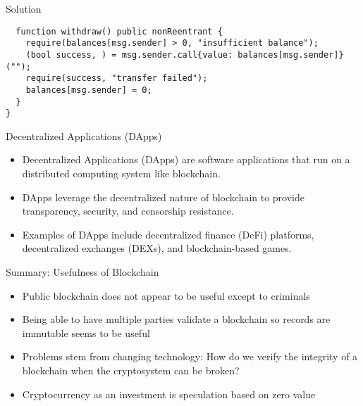 \begin{withoutheadline}
\begin{frame}[fragile]{Solution}
\begin{lstlisting}
  function withdraw() public nonReentrant { 
    require(balances[msg.sender] > 0, "insufficient balance");
    (bool success, ) = msg.sender.call{value: balances[msg.sender]}("");
    require(success, "transfer failed");
    balances[msg.sender] = 0;
  }
}
\end{lstlisting}
\end{frame}

\begin{frame}{Decentralized Applications (DApps)}
    \begin{itemize}
        \item Decentralized Applications (DApps) are software applications that run on a distributed computing system like blockchain.
        \item DApps leverage the decentralized nature of blockchain to provide transparency, security, and censorship resistance.
        \item Examples of DApps include decentralized finance (DeFi) platforms, decentralized exchanges (DEXs), and blockchain-based games.
    \end{itemize}
\end{frame}

\begin{frame}{Summary: Usefulness of Blockchain}
    \begin{itemize}
        \item Public blockchain does not appear to be useful except to criminals
        \item Being able to have multiple parties validate a blockchain so records are immutable seems to be useful
        \item Problems stem from changing technology: How do we verify the integrity of a blockchain when the cryptosystem can be broken?
        \item Cryptocurrency as an investment is speculation based on zero value
    \end{itemize}
\end{frame}

\end{withoutheadline}
 

